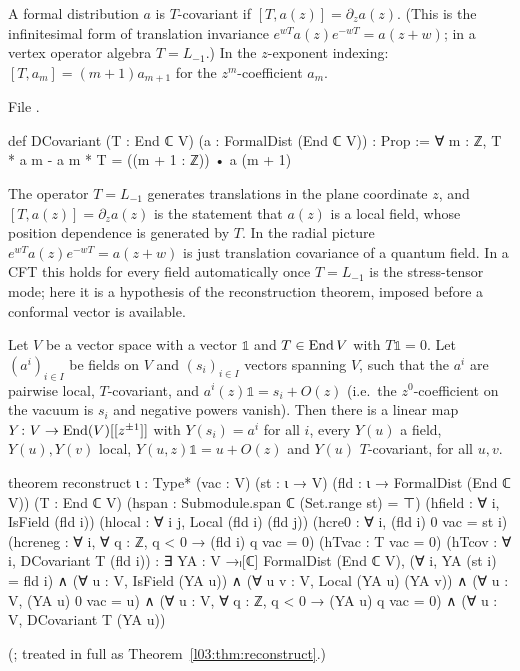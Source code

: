 \begin{definition}\label{ch03:def:DCovariant}
A formal distribution $a$ is $T$-covariant if $[T,a(z)]=\partial_za(z)$. (This is the
infinitesimal form of translation invariance $e^{wT}a(z)e^{-wT}=a(z+w)$; in a vertex operator
algebra $T=L_{-1}$.) In the $z$-exponent
indexing: $[T,a_m]=(m+1)a_{m+1}$ for the $z^m$-coefficient $a_m$.
\end{definition}
\noindent File .
\begin{leancode}
def DCovariant (T : End ℂ V) (a : FormalDist (End ℂ V)) : Prop :=
  ∀ m : ℤ, T * a m - a m * T = ((m + 1 : ℤ)) • a (m + 1)
\end{leancode}

\begin{physics}
The operator $T=L_{-1}$ generates translations in the plane coordinate $z$, and $[T,a(z)]=\partial_za(z)$ is the statement that $a(z)$ is a local field, whose position dependence is generated by $T$. In the radial picture $e^{wT}a(z)e^{-wT}=a(z+w)$ is just translation covariance of a quantum field. In a CFT this holds for every field automatically once $T=L_{-1}$ is the stress-tensor mode; here it is a hypothesis of the reconstruction theorem, imposed before a conformal vector is available.
\end{physics}

\begin{theorem}[Reconstruction]\label{ch03:thm:reconstruct}
Let $V$ be a vector space with a vector $\mathbb 1$ and $T\in\operatorname{End} V$ with $T\mathbb1=0$. Let
$(a^i)_{i\in I}$ be fields on $V$ and $(s_i)_{i\in I}$ vectors spanning $V$, such that the $a^i$
are pairwise local, $T$-covariant, and $a^i(z)\mathbb 1=s_i+O(z)$ (i.e.\ the $z^0$-coefficient on
the vacuum is $s_i$ and negative powers vanish). Then there is a linear map
$Y\colon V\to\operatorname{End}(V)[[z^{\pm1}]]$ with $Y(s_i)=a^i$ for all $i$, every $Y(u)$ a field,
$Y(u),Y(v)$ local, $Y(u,z)\mathbb1=u+O(z)$ and $Y(u)$ $T$-covariant, for all $u,v$.
\end{theorem}
\begin{leancode}
theorem reconstruct {ι : Type*} (vac : V) (st : ι → V) (fld : ι → FormalDist (End ℂ V))
    (T : End ℂ V)
    (hspan : Submodule.span ℂ (Set.range st) = ⊤)
    (hfield : ∀ i, IsField (fld i))
    (hlocal : ∀ i j, Local (fld i) (fld j))
    (hcre0 : ∀ i, (fld i) 0 vac = st i)
    (hcreneg : ∀ i, ∀ q : ℤ, q < 0 → (fld i) q vac = 0)
    (hTvac : T vac = 0)
    (hTcov : ∀ i, DCovariant T (fld i)) :
    ∃ YA : V →ₗ[ℂ] FormalDist (End ℂ V),
      (∀ i, YA (st i) = fld i) ∧
      (∀ u : V, IsField (YA u)) ∧
      (∀ u v : V, Local (YA u) (YA v)) ∧
      (∀ u : V, (YA u) 0 vac = u) ∧
      (∀ u : V, ∀ q : ℤ, q < 0 → (YA u) q vac = 0) ∧
      (∀ u : V, DCovariant T (YA u))
\end{leancode}
(; treated in full as Theorem~\ref{l03:thm:reconstruct}.)

